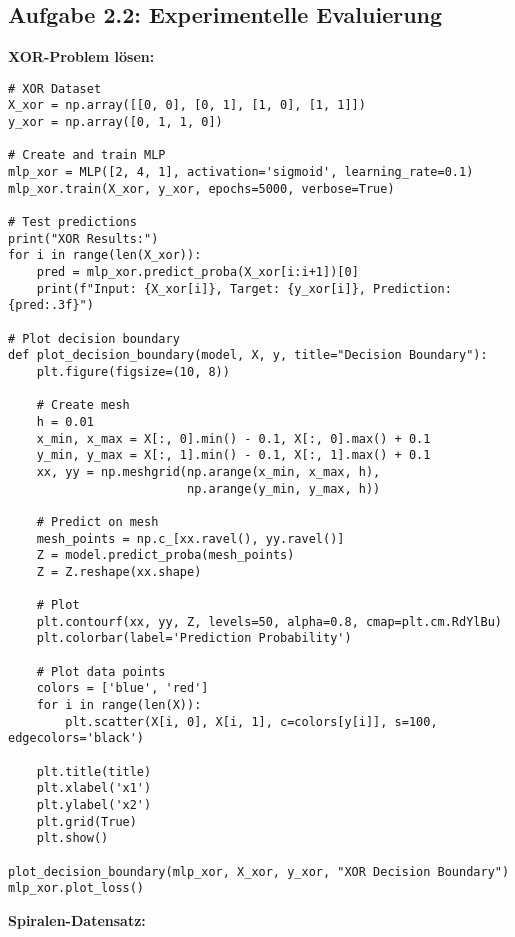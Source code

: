 ﻿\documentclass[12pt,a4paper]{article}
\begin{document}
\subsection{Aufgabe 2.2: Experimentelle Evaluierung}

\textbf{XOR-Problem lösen:}

\begin{lstlisting}
# XOR Dataset
X_xor = np.array([[0, 0], [0, 1], [1, 0], [1, 1]])
y_xor = np.array([0, 1, 1, 0])

# Create and train MLP
mlp_xor = MLP([2, 4, 1], activation='sigmoid', learning_rate=0.1)
mlp_xor.train(X_xor, y_xor, epochs=5000, verbose=True)

# Test predictions
print("XOR Results:")
for i in range(len(X_xor)):
    pred = mlp_xor.predict_proba(X_xor[i:i+1])[0]
    print(f"Input: {X_xor[i]}, Target: {y_xor[i]}, Prediction: {pred:.3f}")

# Plot decision boundary
def plot_decision_boundary(model, X, y, title="Decision Boundary"):
    plt.figure(figsize=(10, 8))
    
    # Create mesh
    h = 0.01
    x_min, x_max = X[:, 0].min() - 0.1, X[:, 0].max() + 0.1
    y_min, y_max = X[:, 1].min() - 0.1, X[:, 1].max() + 0.1
    xx, yy = np.meshgrid(np.arange(x_min, x_max, h),
                         np.arange(y_min, y_max, h))
    
    # Predict on mesh
    mesh_points = np.c_[xx.ravel(), yy.ravel()]
    Z = model.predict_proba(mesh_points)
    Z = Z.reshape(xx.shape)
    
    # Plot
    plt.contourf(xx, yy, Z, levels=50, alpha=0.8, cmap=plt.cm.RdYlBu)
    plt.colorbar(label='Prediction Probability')
    
    # Plot data points
    colors = ['blue', 'red']
    for i in range(len(X)):
        plt.scatter(X[i, 0], X[i, 1], c=colors[y[i]], s=100, edgecolors='black')
    
    plt.title(title)
    plt.xlabel('x1')
    plt.ylabel('x2')
    plt.grid(True)
    plt.show()

plot_decision_boundary(mlp_xor, X_xor, y_xor, "XOR Decision Boundary")
mlp_xor.plot_loss()
\end{lstlisting}

\textbf{Spiralen-Datensatz:}
\end{document}
